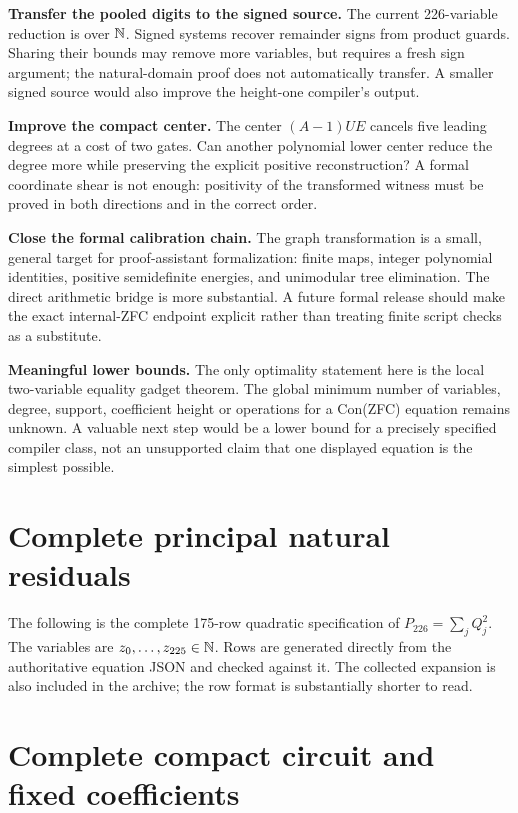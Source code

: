 \documentclass[11pt,letterpaper]{article}
\theoremstyle{definition}\newtheorem{definition}[theorem]{Definition}
\theoremstyle{remark}\newtheorem{remark}[theorem]{Remark}
\begin{document}
\textbf{Transfer the pooled digits to the signed source.}
The current 226-variable reduction is over \(\mathbb N\). Signed systems recover
remainder signs from product guards. Sharing their bounds may remove more
variables, but requires a fresh sign argument; the natural-domain proof
does not automatically transfer. A smaller signed source would also
improve the height-one compiler's output.

\textbf{Improve the compact center.}
The center \((A-1)UE\) cancels five leading degrees at a cost of two gates.
Can another polynomial lower center reduce the degree more while preserving
the explicit positive reconstruction? A formal coordinate shear is not
enough: positivity of the transformed witness must be proved in both
directions and in the correct order.

\textbf{Close the formal calibration chain.}
The graph transformation is a small, general target for proof-assistant
formalization: finite maps, integer polynomial identities, positive
semidefinite energies, and unimodular tree elimination. The direct
arithmetic bridge is more substantial. A future formal release should
make the exact internal-ZFC endpoint explicit rather than treating
finite script checks as a substitute.

\textbf{Meaningful lower bounds.}
The only optimality statement here is the local two-variable equality
gadget theorem. The global minimum number of variables, degree, support,
coefficient height or operations for a Con(ZFC) equation remains unknown.
A valuable next step would be a lower bound for a precisely specified
compiler class, not an unsupported claim that one displayed equation is
the simplest possible.

\appendix
\section{Complete principal natural residuals}\label{app:residuals}

The following is the complete 175-row quadratic specification of
\(P_{226}=\sum_jQ_j^2\). The variables are \(z_0,\ldots,z_{225}\in\mathbb N\).
Rows are generated directly from the authoritative equation JSON and
checked against it. The collected expansion is also included in the
archive; the row format is substantially shorter to read.


\section{Complete compact circuit and fixed coefficients}\label{app:constants}
\end{document}
